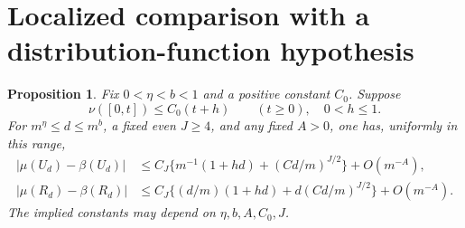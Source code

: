 \documentclass[11pt]{article}
\newtheorem{proposition}{Proposition}
\begin{document}
\section*{Localized comparison with a distribution-function hypothesis}
\begin{proposition}\label{localized}
Fix $0<\eta<b<1$ and a positive constant $C_0$. Suppose
\begin{equation}\label{cdf}
 \nu([0,t])\le C_0(t+h)\qquad(t\ge0),\quad0<h\le1.
\end{equation}
For $m^\eta\le d\le m^b$, a fixed even $J\ge4$, and any fixed
$A>0$, one has, uniformly in this range,
\begin{align}
 |\mu(U_d)-\beta(U_d)|
 &\le C_J\{m^{-1}(1+hd)+(Cd/m)^{J/2}\}+O(m^{-A}),\label{Ucompare}\\
 |\mu(R_d)-\beta(R_d)|
 &\le C_J\{(d/m)(1+hd)+d(Cd/m)^{J/2}\}+O(m^{-A}).\label{Rcompare}
\end{align}
The implied constants may depend on $\eta,b,A,C_0,J$.
\end{proposition}
\end{document}
